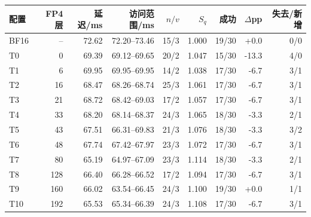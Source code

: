 \begin{tabular}{lrrrrrrrr}
\toprule
配置 & FP4 层 & 延迟/ms & 访问范围/ms & $n/v$ & $S_q$ & 成功 & $\Delta$pp & 失去/新增 \\
\midrule
BF16 & -- & 72.62 & 72.20--73.46 & 15/3 & 1.000 & 19/30 & +0.0 & 0/0 \\
T0 & 0 & 69.39 & 69.12--69.65 & 20/2 & 1.047 & 15/30 & -13.3 & 4/0 \\
T1 & 6 & 69.95 & 69.95--69.95 & 14/2 & 1.038 & 17/30 & -6.7 & 3/1 \\
T2 & 16 & 68.47 & 68.26--68.74 & 25/3 & 1.061 & 17/30 & -6.7 & 3/1 \\
T3 & 21 & 68.72 & 68.42--69.03 & 17/2 & 1.057 & 17/30 & -6.7 & 3/1 \\
T4 & 33 & 68.20 & 68.14--68.37 & 24/3 & 1.065 & 18/30 & -3.3 & 2/1 \\
T5 & 43 & 67.51 & 66.31--69.83 & 21/3 & 1.076 & 18/30 & -3.3 & 3/2 \\
T6 & 48 & 67.74 & 67.42--67.97 & 23/3 & 1.072 & 17/30 & -6.7 & 3/1 \\
T7 & 80 & 65.19 & 64.97--67.09 & 23/3 & 1.114 & 18/30 & -3.3 & 2/1 \\
T8 & 128 & 66.40 & 66.28--66.52 & 17/2 & 1.094 & 17/30 & -6.7 & 3/1 \\
T9 & 160 & 66.02 & 63.54--66.45 & 24/3 & 1.100 & 19/30 & +0.0 & 1/1 \\
T10 & 192 & 65.53 & 65.34--66.39 & 24/3 & 1.108 & 17/30 & -6.7 & 3/1 \\
\bottomrule
\end{tabular}
